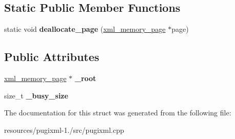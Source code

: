 \subsection*{Static Public Member Functions}
\begin{DoxyCompactItemize}
\item 
\hypertarget{structxml__allocator_a1c6bfe15a257a094f55659f8d71c209e}{static void {\bfseries deallocate\+\_\+page} (\hyperlink{structxml__memory__page}{xml\+\_\+memory\+\_\+page} $\ast$page)}\label{structxml__allocator_a1c6bfe15a257a094f55659f8d71c209e}

\end{DoxyCompactItemize}
\subsection*{Public Attributes}
\begin{DoxyCompactItemize}
\item 
\hypertarget{structxml__allocator_a38082e85b23743620a257f997a00bb69}{\hyperlink{structxml__memory__page}{xml\+\_\+memory\+\_\+page} $\ast$ {\bfseries \+\_\+root}}\label{structxml__allocator_a38082e85b23743620a257f997a00bb69}

\item 
\hypertarget{structxml__allocator_a4908b4aaa8cbbc3bf936ab8a938053c0}{size\+\_\+t {\bfseries \+\_\+busy\+\_\+size}}\label{structxml__allocator_a4908b4aaa8cbbc3bf936ab8a938053c0}

\end{DoxyCompactItemize}


The documentation for this struct was generated from the following file\+:\begin{DoxyCompactItemize}
\item 
resources/pugixml-\/1./src/pugixml.\+cpp\end{DoxyCompactItemize}
